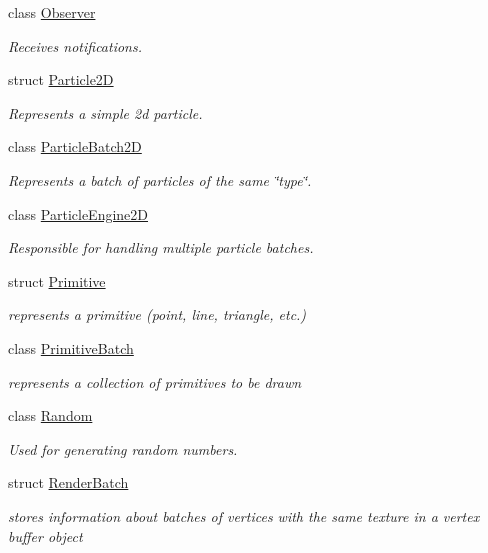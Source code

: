\begin{DoxyCompactItemize}
class \hyperlink{classnta_1_1Observer}{Observer}
\begin{DoxyCompactList}\small\item\em Receives notifications. \end{DoxyCompactList}\item 
struct \hyperlink{structnta_1_1Particle2D}{Particle2D}
\begin{DoxyCompactList}\small\item\em Represents a simple 2d particle. \end{DoxyCompactList}\item 
class \hyperlink{classnta_1_1ParticleBatch2D}{Particle\+Batch2D}
\begin{DoxyCompactList}\small\item\em Represents a batch of particles of the same \char`\"{}type\char`\"{}. \end{DoxyCompactList}\item 
class \hyperlink{classnta_1_1ParticleEngine2D}{Particle\+Engine2D}
\begin{DoxyCompactList}\small\item\em Responsible for handling multiple particle batches. \end{DoxyCompactList}\item 
struct \hyperlink{structnta_1_1Primitive}{Primitive}
\begin{DoxyCompactList}\small\item\em represents a primitive (point, line, triangle, etc.) \end{DoxyCompactList}\item 
class \hyperlink{classnta_1_1PrimitiveBatch}{Primitive\+Batch}
\begin{DoxyCompactList}\small\item\em represents a collection of primitives to be drawn \end{DoxyCompactList}\item 
class \hyperlink{classnta_1_1Random}{Random}
\begin{DoxyCompactList}\small\item\em Used for generating random numbers. \end{DoxyCompactList}\item 
struct \hyperlink{structnta_1_1RenderBatch}{Render\+Batch}
\begin{DoxyCompactList}\small\item\em stores information about batches of vertices with the same texture in a vertex buffer object \end{DoxyCompactList}\item 

\end{DoxyCompactItemize}
